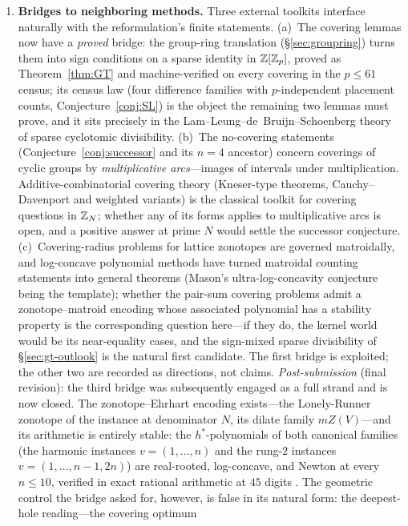 \begin{enumerate}[leftmargin=1.7em,itemsep=4pt]
\item \textbf{Bridges to neighboring methods.} Three external toolkits
  interface naturally with the reformulation's finite statements.
  (a)~The covering lemmas now have a \emph{proved} bridge: the group-ring
  translation (\S\ref{sec:groupring}) turns them into sign conditions on
  a sparse identity in $\mathbb{Z}[\mathbb{Z}_p]$, proved as Theorem~\ref{thm:GT} and
  machine-verified on every covering in the $p\le61$ census; its census
  law (four difference families with $p$-independent placement counts,
  Conjecture~\ref{conj:SL}) is the object the remaining two lemmas must
  prove, and it sits precisely in the Lam--Leung--de~Bruijn--Schoenberg
  theory of sparse cyclotomic divisibility.
  (b)~The no-covering
  statements (Conjecture~\ref{conj:successor} and its $n=4$ ancestor)
  concern coverings of cyclic groups by \emph{multiplicative
  arcs}---images of intervals under multiplication. Additive-combinatorial
  covering theory (Kneser-type theorems, Cauchy--Davenport and weighted
  variants) is the classical toolkit for covering questions in $\mathbb{Z}_N$;
  whether any of its forms applies to multiplicative arcs is open, and a
  positive answer at prime $N$ would settle the successor conjecture.
  (c)~Covering-radius problems for lattice zonotopes are governed
  matroidally, and log-concave polynomial methods have turned matroidal
  counting statements into general theorems (Mason's ultra-log-concavity
  conjecture being the template); whether the pair-sum covering problems
  admit a zonotope--matroid encoding whose associated polynomial has a
  stability property is the corresponding question here---if they do, the
  kernel world would be its near-equality cases, and the sign-mixed
  sparse divisibility of \S\ref{sec:gt-outlook} is the natural first
  candidate. The first bridge is exploited; the other two are recorded as
  directions, not claims. \emph{Post-submission} (final revision): the
  third bridge was subsequently engaged as a full strand and is now
  closed. The zonotope--Ehrhart encoding exists---the Lonely-Runner
  zonotope of the instance at denominator $N$, its dilate family
  $mZ(V)$---and its arithmetic is entirely stable: the $h^*$-polynomials
  of both canonical families (the harmonic instances $v=(1,\dots,n)$ and
  the rung-$2$ instances $v=(1,\dots,n{-}1,2n)$) are real-rooted,
  log-concave, and Newton at every $n\le 10$, verified in exact
  rational arithmetic at $45$ digits \cite{companion-paper}. The
  geometric control the bridge asked for, however, is false in its
  natural form: the deepest-hole reading---the covering optimum

\end{enumerate}
